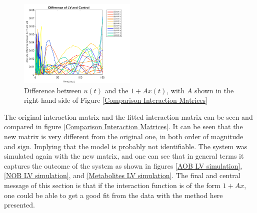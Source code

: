 \documentclass[3p,times]{elsarticle}
\begin{document}
\begin{figure}[h]
	\centering
	\includegraphics[width=0.5\textwidth]{Synthetic_data_no_noise//221119_no_noise_iter_5_difference_fit_5_LV}
	\caption{Difference between $u(t)$ and the $1+Ax(t)$, with $A$ shown in the right hand side of Figure \ref{Comparison Interaction Matrices}}
	\label{Difference fit}
\end{figure} 
\clearpage

The original interaction matrix and the fitted interaction matrix can be seen and compared in figure \eqref{Comparison Interaction Matrices}. It can be seen that the new matrix is very different from the original one, in both order of magnitude and sign. Implying that the model is probably not identifiable. The system was simulated again with the new matrix, and one can see that in general terms it captures the outcome of the system as shown in figures \ref{AOB LV simulation}, \ref{NOB LV simulation}, and \ref{Metabolites LV simulation}. The final and central message of this section is that if the interaction function is of the form $1+Ax$, one could be able to get a good fit from the data with the method here presented.
\end{document}
